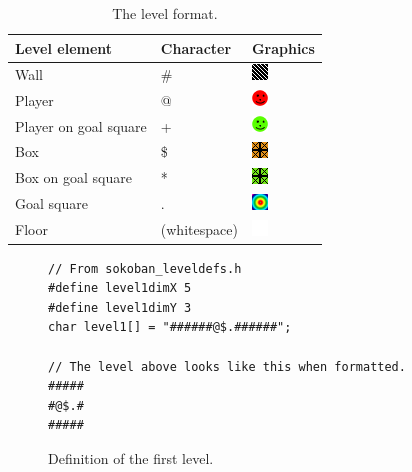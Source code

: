 \documentclass[a4paper,11pt]{article}
\begin{document}
\begin{table}[H]
\centering
\begin{tabular}{|l|l|l|}
\hline \textbf{Level element} & \textbf{Character} & \textbf{Graphics} \\ 
\hline Wall & \# & \includegraphics[scale=0.6]{images/wall.png} \\ 
\hline Player & @ & \includegraphics[scale=0.6]{images/player.png} \\ 
\hline Player on goal square & + & \includegraphics[scale=0.6]{images/playertarget.png} \\ 
\hline Box & \$ & \includegraphics[scale=0.6]{images/crate.png}\\ 
\hline Box on goal square & * & \includegraphics[scale=0.6]{images/cratetarget.png}\\ 
\hline Goal square & . & \includegraphics[scale=0.6]{images/target.png}\\ 
\hline Floor & (whitespace) & \includegraphics[scale=0.6]{images/blank.png} \\ 
\hline 
\end{tabular}
\caption{The level format.}
\label{tab:levelformat}
\end{table}

\begin{figure}[H]
\begin{lstlisting}
// From sokoban_leveldefs.h
#define level1dimX 5
#define level1dimY 3
char level1[] = "######@$.######";

// The level above looks like this when formatted.
#####
#@$.#
#####
\end{lstlisting}
\caption{Definition of the first level.}
\label{fig:leveldef}
\end{figure}
\end{document}
